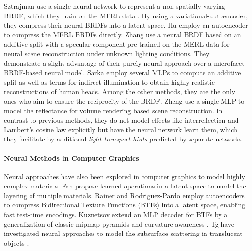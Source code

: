Sztrajman \etal \cite{sztrajman2021neural} use a single neural network to represent a non-spatially-varying BRDF, which they train on the MERL data \cite{matusik2003MERL}. By using a variational-autoencoder, they compress their neural BRDFs into a latent space.
Hu \etal \cite{hu2020deepbrdf} employ an autoencoder to compress the MERL BRDFs directly.
Zhang \etal \cite{Zhang2021NeRFactor} use a neural BRDF based on an additive split with a specular component pre-trained on the MERL data \cite{matusik2003MERL} for neural scene reconstruction under unknown lighting conditions. They demonstrate a slight advantage of their purely neural approach over a microfacet BRDF-based neural model.
Sarka \etal \cite{Sarkar23LitNerf} employ several MLPs to compute an additive split as well as terms for indirect illumination to obtain highly realistic reconstructions of human heads. 
Among the other methods,
they are the only ones who aim to ensure the reciprocity of the BRDF.
Zheng \etal \cite{Zeng23RelightingNeRFsWithShadowAndHighlightHints} use a single MLP to model the reflectance for volume rendering based scene reconstruction. In contrast to previous methods, they do not model effects like interreflection and Lambert's cosine law explicitly but have the neural network learn them, which they facilitate by additional \emph{light transport hints} predicted by separate networks.

\paragraph{Neural Methods in Computer Graphics}

Neural approaches have also been explored in computer graphics to model highly complex materials.
Fan \etal \cite{Fan2022NeuralLayeredBRDF} propose learned operations in a latent space to model the layering of multiple materials.
Rainer \etal \cite{rainer2019neuralBTFCompression,rainer2020unifiedNeuralEncodingOfBTFs} and Rodriguez-Pardo \etal\cite{rodriguez2023neubtf} employ autoencoders to compress Bidirectional Texture Functions (BTFs) into a latent space, enabling fast test-time encodings.
Kuznetsov \etal extend an MLP decoder for BTFs by a generalization of classic mipmap pyramids and curvature awareness \cite{Kuznetsov21NeuMIP,kuznetsov2022renderingNeuralMaterialsOnCurvedSurfaces}.
Tg \etal have investigated neural approaches to model the subsurface scattering in translucent objects \cite{tg2024neuralSSS,TG23NeuralBSSRDF}.

